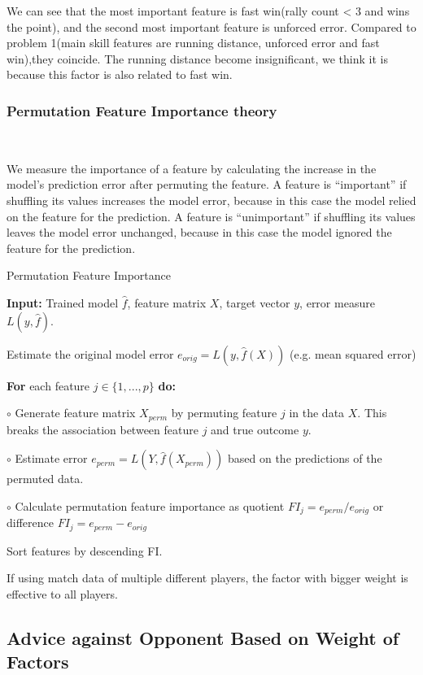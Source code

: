 We can see that the most important feature is fast win(rally count < 3 and wins the point),
and the second most important feature is unforced error. Compared to problem 1(main skill features are
running distance, unforced error and fast win),they coincide. The running distance become insignificant, 
we think it is because this factor is also related to fast win.

\subsubsection{Permutation Feature Importance theory}~{}

We measure the importance of a feature by calculating the increase in the model’s prediction error 
after permuting the feature. A feature is “important” if shuffling its values increases the model error, 
because in this case the model relied on the feature for the prediction. A feature is “unimportant” if 
shuffling its values leaves the model error unchanged, because in this case the model ignored the feature 
for the prediction. 

\begin{algorithm}  
    \caption{Permutation Feature Importance}  
    \textbf{Input:} Trained model $\hat{f}$, feature matrix $X$, target vector $y$, error measure $L(y, \hat{f})$.  
      
    Estimate the original model error $e_{orig} = L(y, \hat{f}(X))$ (e.g. mean squared error)  
      
    \textbf{For} each feature $j \in \{1, ..., p\}$ \textbf{do:}  
      
    \quad\quad $\circ$ Generate feature matrix $X_{perm}$ by permuting feature $j$ in the data $X$. This breaks the association between feature $j$ and true outcome $y$.  
      
    \quad\quad $\circ$ Estimate error $e_{perm} = L(Y, \hat{f}(X_{perm}))$ based on the predictions of the permuted data.  
      
    \quad\quad $\circ$ Calculate permutation feature importance as quotient $FI_j = e_{perm} / e_{orig}$ or difference $FI_j = e_{perm} - e_{orig}$  
      
    Sort features by descending FI.
\end{algorithm}

If using match data of multiple different players, the factor with bigger weight is effective to 
all players.

\subsection{Advice against Opponent Based on Weight of Factors}

